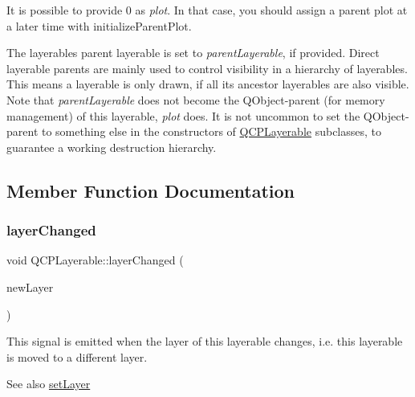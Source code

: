 It is possible to provide 0 as {\itshape plot}. In that case, you should assign a parent plot at a later time with initialize\+Parent\+Plot.

The layerable\textquotesingle{}s parent layerable is set to {\itshape parent\+Layerable}, if provided. Direct layerable parents are mainly used to control visibility in a hierarchy of layerables. This means a layerable is only drawn, if all its ancestor layerables are also visible. Note that {\itshape parent\+Layerable} does not become the Q\+Object-\/parent (for memory management) of this layerable, {\itshape plot} does. It is not uncommon to set the Q\+Object-\/parent to something else in the constructors of \mbox{\hyperlink{class_q_c_p_layerable}{Q\+C\+P\+Layerable}} subclasses, to guarantee a working destruction hierarchy. 

\subsection{Member Function Documentation}
\mbox{\label{class_q_c_p_layerable_abbf8657cedea73ac1c3499b521c90eba}} 
\subsubsection{\texorpdfstring{layer\+Changed}{layerChanged}}
{\footnotesize\ttfamily void Q\+C\+P\+Layerable\+::layer\+Changed (\begin{DoxyParamCaption}\item[{\mbox{\hyperlink{class_q_c_p_layer}{Q\+C\+P\+Layer}} $\ast$}]{new\+Layer }\end{DoxyParamCaption})\hspace{0.3cm}{\ttfamily [signal]}}

This signal is emitted when the layer of this layerable changes, i.\+e. this layerable is moved to a different layer.

\begin{DoxySeeAlso}{See also}
\mbox{\hyperlink{class_q_c_p_layerable_ab0d0da6d2de45a118886d2c8e16d5a54}{set\+Layer}} 
\end{DoxySeeAlso}
\mbox{\label{class_q_c_p_layerable_a4171e2e823aca242dd0279f00ed2de81}} 

